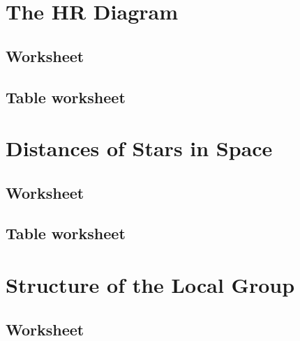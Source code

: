 \documentclass[12pt]{article}
\begin{document}
\newpage
\section{The HR Diagram}\label{apx:lab_09}
\subsection{Worksheet}\label{apx:lab_09_ws}


\newpage
\subsection{Table worksheet}\label{apx:lab_09_tb}
%

\newpage
\section{Distances of Stars in Space}\label{apx:lab_10}
\subsection{Worksheet}\label{apx:lab_10_ws}


\newpage
\subsection{Table worksheet}\label{apx:lab_10_tb}
%

\newpage
\section{Structure of the Local Group}\label{apx:lab_11}
\subsection{Worksheet}\label{apx:lab_11_ws}
%
\end{document}
